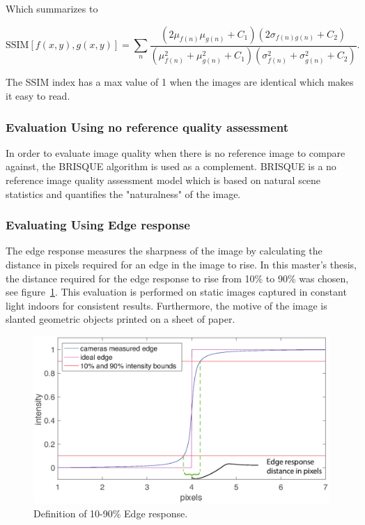 Which summarizes to

\begin{equation}
\text{SSIM}[f(x,y),g(x,y)] = \sum_n \frac{(2\mu_{f(n)}\mu_{g(n)} + C_1)(2\sigma_{f(n)g(n)} + C_2)}{(\mu_{f(n)}^2 + \mu_{g(n)}^2 + C_1)(\sigma_{f(n)}^2 + \sigma_{g(n)}^2 + C_2)}.
\end{equation} 

The SSIM index has a max value of 1 when the images are identical which makes it easy to read. \cite{book:image_processing}

\subsubsection{Evaluation Using no reference quality assessment}
In order to evaluate image quality when there is no reference image to compare against, the BRISQUE algorithm is used as a complement. BRISQUE is a no reference image quality assessment model which is based on natural scene statistics and quantifies the "naturalness" of the image.    \cite{article:brisque}

\subsubsection{Evaluating Using Edge response}
\label{sec:edge_res_def_method}
The edge response measures the sharpness of the image by calculating the distance in pixels required for an edge in the image to rise. In this master's thesis, the distance required for the edge response to rise from 10\% to 90\% was chosen, see figure~\ref{fig:edge_response_def}. This evaluation is performed on static images captured in constant light indoors for consistent results. Furthermore, the motive of the image is slanted geometric objects printed on a sheet of paper.\cite{article:FOI_pres_sens}
 
\begin{figure}[H]
\includegraphics[width = 1\textwidth]{./result/edge_response.eps}
	\caption{Definition of 10-90\% Edge response.}
	\label{fig:edge_response_def}
\end{figure}

